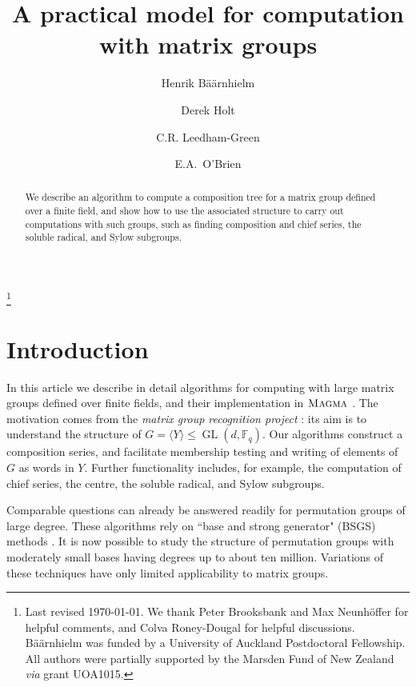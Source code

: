 \documentclass[12pt,twoside,reqno,psamsfonts]{amsproc}
\title{A practical model for computation with matrix groups}
\author{Henrik B\"a\"arnhielm}
\author{Derek Holt}
\author{C.R. Leedham-Green}
\author{E.A.\ O'Brien}
\numberwithin{equation}{section}
\numberwithin{figure}{section}
\newcounter{algorithm}
\theoremstyle{plain}
\theoremstyle{definition}
\theoremstyle{remark}
\newcommand{\field}[1]{\mathbb{#1}}
\newcommand{\F}{\field{F}}
\newcommand{\MAGMA}{\textsc{Magma}}
\DeclareMathOperator{\GL}{GL}
\begin{document}

\begin{abstract}
We describe an algorithm to compute a composition tree
for a matrix group defined over a finite field, and 
show how to use the associated structure 
to carry out computations with such groups,
such as finding composition and chief series, the soluble radical, 
and Sylow subgroups.
\end{abstract}

\maketitle

\footnote{
Last revised \today.
We thank Peter Brooksbank and Max Neunh\"offer for helpful comments,
and Colva Roney-Dougal for helpful discussions. 
B\"a\"arnhielm was funded by a University of Auckland
Postdoctoral Fellowship.
All authors were partially supported by the Marsden Fund of New
Zealand  \emph{via} grant UOA1015.}

\section{Introduction}
In this article we describe in detail algorithms for computing with large 
matrix groups defined over finite fields, and their implementation in
$\MAGMA$ \cite{Magma}. 
The motivation comes from the \emph{matrix group recognition
project} \cite{crlg01}: its aim is
to understand the structure of $G = \langle Y \rangle \leqslant \GL(d, \F_q)$. 
Our algorithms construct a composition series, and facilitate membership 
testing and writing of elements of $G$ as words 
in $Y$. Further functionality includes, for example,
the computation of chief series, the centre, the soluble radical, and
Sylow subgroups. 

Comparable questions can already be answered readily for 
permutation groups of large degree.
These algorithms rely on ``base and strong generator" (BSGS) methods
\cite[Chapter 4]{hcgt}. 
It is now possible to study the structure of permutation groups with
moderately small bases having degrees up to about ten million.
Variations of these techniques have only limited applicability
to matrix groups.
\end{document}
